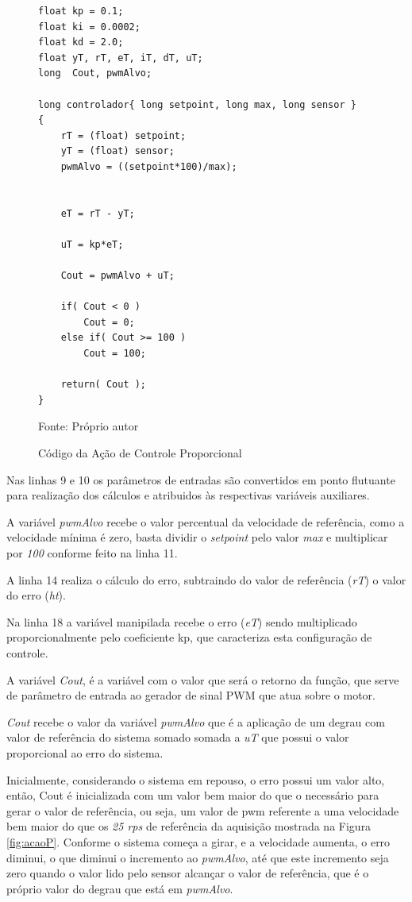 \begin{figure}[!htb]
\centering
\caption{Código da Ação de Controle Proporcional}
\begin{minipage}{0.8\linewidth}
\lstset{firstnumber=1}
\begin{lstlisting}
float kp = 0.1;
float ki = 0.0002;
float kd = 2.0;
float yT, rT, eT, iT, dT, uT;
long  Cout, pwmAlvo;

long controlador{ long setpoint, long max, long sensor }
{
    rT = (float) setpoint;
    yT = (float) sensor;
    pwmAlvo = ((setpoint*100)/max);

    
    eT = rT - yT;
    
    uT = kp*eT;

    Cout = pwmAlvo + uT;

    if( Cout < 0 )
        Cout = 0;
    else if( Cout >= 100 )
        Cout = 100;

    return( Cout );
}
\end{lstlisting}
\end{minipage}
\label{fig:codigoControladorP}

{\small Fonte: Próprio autor}
\end{figure}


Nas linhas 9 e 10 os parâmetros de entradas são convertidos em ponto flutuante para realização dos cálculos e atribuidos às respectivas variáveis auxiliares.

A variável \emph{pwmAlvo} recebe o valor percentual da velocidade de referência, como a velocidade mínima é zero, basta dividir o \emph{setpoint} pelo valor \emph{max} e multiplicar por \emph{100} conforme feito na linha 11.


A linha 14 realiza o cálculo do erro, subtraindo do valor de referência (\emph{rT}) o valor do erro (\emph{ht}).

Na linha 18 a variável manipilada recebe o erro (\emph{eT}) sendo multiplicado proporcionalmente pelo coeficiente kp, que caracteriza esta configuração de controle.

A variável \emph{Cout}, é a variável com o valor que será o retorno da função, que serve de parâmetro de entrada ao gerador de sinal PWM que atua sobre o motor.

\emph{Cout} recebe o valor da variável \emph{pwmAlvo} que é a aplicação de um degrau com valor de referência do sistema somado somada a \emph{uT} que possui o valor proporcional ao erro do sistema. 

Inicialmente, considerando o sistema em repouso, o erro possui um valor alto, então, Cout é inicializada com um valor bem maior do que o necessário para gerar o valor de referência, ou seja, um valor de pwm referente a uma velocidade bem maior do que os \emph{25 rps} de referência da aquisição mostrada na Figura \ref{fig:acaoP}. Conforme o sistema começa a girar, e a velocidade aumenta, o erro diminui, o que diminui o incremento ao \emph{pwmAlvo}, até que este incremento seja zero quando o valor lido pelo sensor alcançar o valor de referência, que é o próprio valor do degrau que está em \emph{pwmAlvo}.

